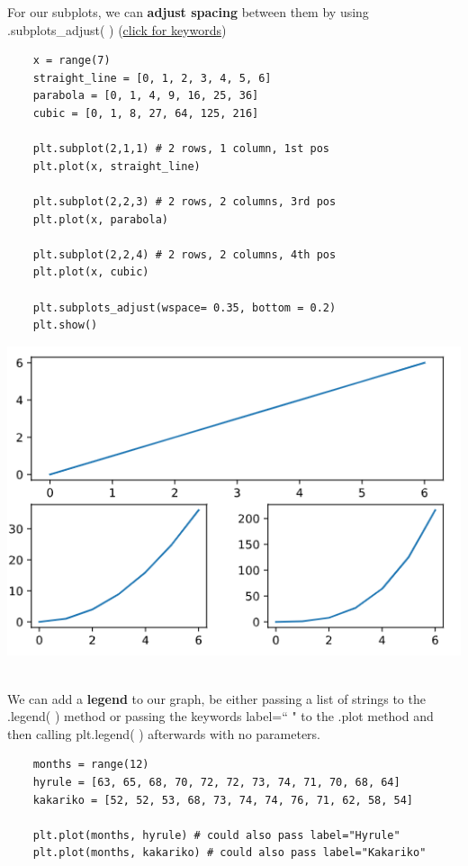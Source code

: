 \documentclass[11pt, a4paper]{article}
\begin{document}
\begin{spacing}{1.1}
	\noindent For our subplots, we can \textbf{adjust spacing} between them by using .subplots\_adjust( ) (\href{https://matplotlib.org/api/_as_gen/matplotlib.pyplot.subplots_adjust.html}{click for keywords})
	\begin{minipage}[c]{10cm}
	\begin{lstlisting}
	x = range(7)
	straight_line = [0, 1, 2, 3, 4, 5, 6]
	parabola = [0, 1, 4, 9, 16, 25, 36]
	cubic = [0, 1, 8, 27, 64, 125, 216]
		
	plt.subplot(2,1,1) # 2 rows, 1 column, 1st pos
	plt.plot(x, straight_line)
		
	plt.subplot(2,2,3) # 2 rows, 2 columns, 3rd pos
	plt.plot(x, parabola)
		
	plt.subplot(2,2,4) # 2 rows, 2 columns, 4th pos
	plt.plot(x, cubic)
		
	plt.subplots_adjust(wspace= 0.35, bottom = 0.2)
	plt.show() \end{lstlisting}\vspace*{1mm}
	\end{minipage}
	\begin{minipage}[c]{7cm}
		\includegraphics[scale=.55]{subadj}
	\end{minipage} \\
	We can add a \textbf{legend} to our graph, be either passing a list of strings to the .legend( ) method or passing the keywords label=`` " to the .plot method and then calling plt.legend( ) afterwards with no parameters.
	\begin{lstlisting}
	months = range(12)
	hyrule = [63, 65, 68, 70, 72, 72, 73, 74, 71, 70, 68, 64]
	kakariko = [52, 52, 53, 68, 73, 74, 74, 76, 71, 62, 58, 54]
	
	plt.plot(months, hyrule) # could also pass label="Hyrule"
	plt.plot(months, kakariko) # could also pass label="Kakariko"
	

\end{lstlisting}
\end{spacing}
\end{document}
